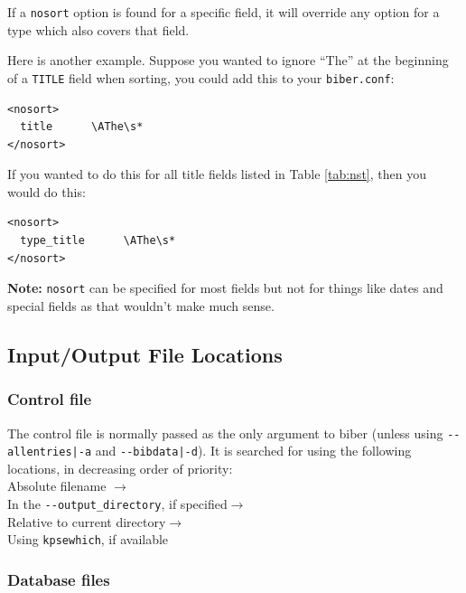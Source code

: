 \documentclass{ltxdockit}
\begin{document}
If a \verb+nosort+ option is found for a specific field, it will override
any option for a type which also covers that field.

Here is another example. Suppose you wanted to ignore ``The'' at the
beginning of a \verb+TITLE+ field when sorting, you could add this to your
\verb+biber.conf+:

\begin{verbatim}
<nosort>
  title      \AThe\s*
</nosort>
\end{verbatim}

\noindent If you wanted to do this for all title fields listed in Table
\ref{tab:nst}, then you would do this:

\begin{verbatim}
<nosort>
  type_title      \AThe\s*
</nosort>
\end{verbatim}

\noindent \textbf{Note:} \verb+nosort+ can be specified for most fields but
not for things like dates and special fields as that wouldn't make much sense.

\subsection{Input/Output File Locations}

\subsubsection{Control file}\label{loc:cf}

The control file is normally passed as the only argument to biber
(unless using \verb+--allentries|-a+ and \verb+--bibdata|-d+). It is
searched for using the following locations, in decreasing order of
priority:\\[2ex]

\noindent Absolute filename $\rightarrow$\\
\hspace*{1em}In the \verb+--output_directory+, if specified$\rightarrow$\\
\hspace*{2em}Relative to current directory$\rightarrow$\\
\hspace*{3em}Using \verb+kpsewhich+, if available

\subsubsection{Database files}
\end{document}
